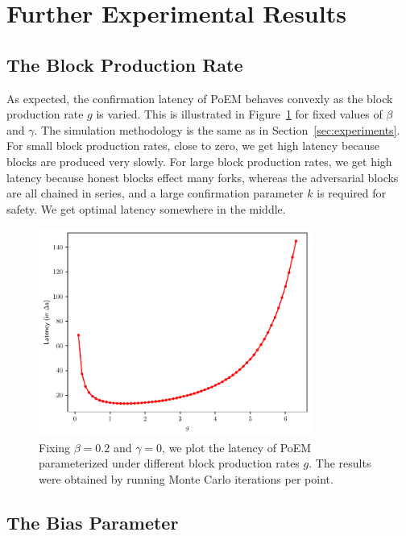 \section{Further Experimental Results}\label{sec:more-experiments}

\subsection{The Block Production Rate}

As expected, the confirmation latency of PoEM behaves convexly as the block production rate $g$ is varied.
This is illustrated in Figure~\ref{fig:g_latency} for fixed values of $\beta$ and $\gamma$.
The simulation methodology is the same as in Section~\ref{sec:experiments}.
For small block production rates, close to zero, we get high latency because blocks are produced very slowly.
For large block production rates, we get high latency because honest blocks effect many forks, whereas the adversarial blocks
are all chained in series, and a large confirmation parameter $k$ is required for safety.
We get optimal latency somewhere in the middle.

\begin{figure}[pt]
  \centering
  \includegraphics[width = 0.8\textwidth]{figures/g_latency.pdf}

  \caption{Fixing $\beta=0.2$ and $\gamma=0$, we plot the latency of PoEM parameterized under different block production rates $g$.
           The results were obtained by running \montecarlo{} Monte Carlo iterations per point.}
  \label{fig:g_latency}
\end{figure}

\subsection{The Bias Parameter}

